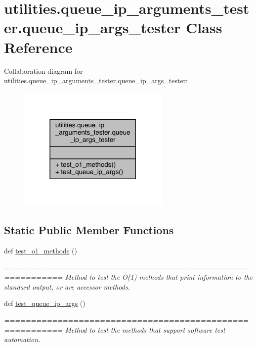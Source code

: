 \hypertarget{classutilities_1_1queue__ip__arguments__tester_1_1queue__ip__args__tester}{}\section{utilities.\+queue\+\_\+ip\+\_\+arguments\+\_\+tester.\+queue\+\_\+ip\+\_\+args\+\_\+tester Class Reference}
\label{classutilities_1_1queue__ip__arguments__tester_1_1queue__ip__args__tester}


Collaboration diagram for utilities.\+queue\+\_\+ip\+\_\+arguments\+\_\+tester.\+queue\+\_\+ip\+\_\+args\+\_\+tester\+:
\nopagebreak
\begin{figure}[H]
\begin{center}
\leavevmode
\includegraphics[width=210pt]{d0/dd1/classutilities_1_1queue__ip__arguments__tester_1_1queue__ip__args__tester__coll__graph}
\end{center}
\end{figure}
\subsection*{Static Public Member Functions}
\begin{DoxyCompactItemize}
\item 
def \hyperlink{classutilities_1_1queue__ip__arguments__tester_1_1queue__ip__args__tester_a49bd049dbf616cc1f604d3c0cbe84c43}{test\+\_\+o1\+\_\+methods} ()
\begin{DoxyCompactList}\small\item\em ========================================================= Method to test the O(1) methods that print information to the standard output, or are accessor methods. \end{DoxyCompactList}\item 
def \hyperlink{classutilities_1_1queue__ip__arguments__tester_1_1queue__ip__args__tester_aee90077323d94238d7f81b23e31207c3}{test\+\_\+queue\+\_\+ip\+\_\+args} ()
\begin{DoxyCompactList}\small\item\em ========================================================= Method to test the methods that support software test automation. \end{DoxyCompactList}\end{DoxyCompactItemize}


